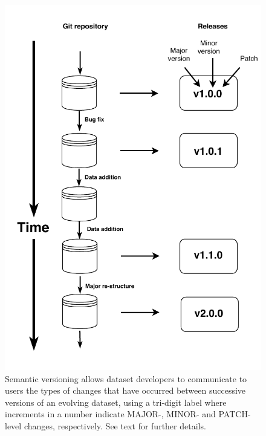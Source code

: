 \documentclass[a4paper,num-refs]{assets/oup-contemporary}
\begin{document}
\begin{figure}[!t]
\centering
\includegraphics[width=\linewidth]{figures/Figure-versions.pdf}
\caption{
Semantic versioning allows dataset developers to communicate to users the types of changes that have occurred between successive versions of an evolving dataset, using a tri-digit label where increments in a number indicate MAJOR-, MINOR- and PATCH-level changes, respectively. See text for further details.}
\label{fig:semantic}
\end{figure}
\end{document}
